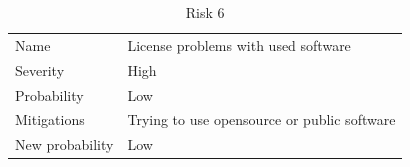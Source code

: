 \begin{table}
  \centering
  \begin{tabular}{ll}
    Name            & License problems with used software           \\
    Severity        & High                                 \\
    Probability     & Low                                   \\
    Mitigations     & Trying to use opensource or public software  \\
    New probability & Low                                   
  \end{tabular}
  \caption{Risk 6}
\end{table}
